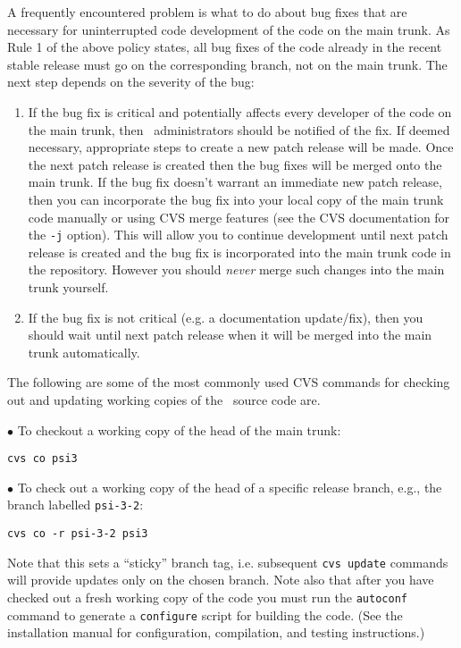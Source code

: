 \noindent A frequently encountered problem is what to do about bug fixes
that are necessary for uninterrupted code development of the code on the
main trunk. As Rule 1 of the above policy states, all bug fixes of the code
already in the recent stable release must go on the corresponding branch,
not on the main trunk. The next step depends on the severity of the bug:
\begin{enumerate}
\item If the bug fix is critical and potentially affects every developer of
the code on the main trunk, then \PSIthree\ administrators should be notified
of the fix. If deemed necessary, appropriate steps to create a new patch
release will be made. Once the next patch release is created then the bug
fixes will be merged onto the main trunk.  If the bug fix doesn't warrant
an immediate new patch release, then you can incorporate the bug fix into
your local copy of the main trunk code manually or using CVS merge features
(see the CVS documentation for the {\tt -j} option). This will allow you to
continue development until next patch release is created and the bug fix
is incorporated into the main trunk code in the repository. However you
should {\em never} merge such changes into the main trunk yourself.
\item If the bug fix is not critical (e.g. a documentation update/fix),
then you should wait until next patch release when it will be merged into
the main trunk automatically.
\end{enumerate}

\noindent
The following are some of the most commonly used CVS commands for checking
out and updating working copies of the \PSIthree\ source code are.

\noindent
$\bullet$ To checkout a working copy of the head of the main trunk:

{\tt cvs co psi3} 

\noindent
$\bullet$ To check out a working copy of the head of a specific release branch,
e.g., the branch labelled {\tt psi-3-2}:

{\tt cvs co -r psi-3-2 psi3}

\noindent Note that this sets a ``sticky'' branch tag, i.e. subsequent
{\tt cvs update} commands will provide updates only on the chosen branch.
Note also that after you have checked out a fresh working copy of the code
you must run the {\tt autoconf} command to generate a {\tt configure} script
for building the code.  (See the installation manual for configuration,
compilation, and testing instructions.)

